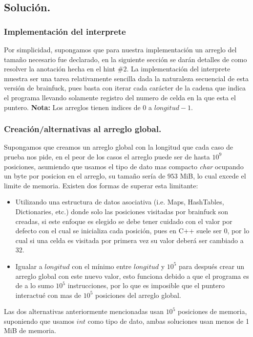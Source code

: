 \documentclass[12pt,letterpaper,titlepage]{article}
\begin{document}
	\subsection{Solución.}
	\subsubsection{Implementación del interprete}
	Por simplicidad, supongamos que para nuestra implementación un arreglo del tamaño necesario fue declarado, en la siguiente sección se darán detalles de como resolver la anotación hecha en el hint $\#2$. La implementación del interprete muestra ser una tarea relativamente sencilla dada la naturaleza secuencial de esta versión de brainfuck, pues basta con iterar cada carácter de la cadena que indica el programa llevando solamente registro del numero de celda en la que esta el puntero. \textbf{Nota:} Los arreglos tienen indices de 0 a $longitud-1$.
	
	\subsubsection{Creación/alternativas al arreglo global.}
	Supongamos que creamos un arreglo global con la longitud que cada caso de prueba nos pide, en el peor de los casos el arreglo puede ser de hasta $10^{9}$ posiciones, asumiendo que usamos el tipo de dato mas compacto \textit{char} ocupando un byte por posicion en el arreglo, su tamaño sería de $953$ MiB, lo cual excede el limite de memoria. Existen dos formas de superar esta limitante:
	\begin{itemize}
		\item Utilizando una estructura de datos asociativa (i.e. Maps, HashTables, Dictionaries, etc.) donde solo las posiciones visitadas por brainfuck son creadas, si este enfoque es elegido se debe tener cuidado con el valor por defecto con el cual se inicializa cada posición, pues en C++ suele ser 0, por lo cual si una celda es visitada por primera vez su valor deberá ser cambiado a 32.
		\item Igualar a $longitud$ con el mínimo entre $longitud$ y $10^{5}$ para después crear un arreglo global con este nuevo valor, esto funciona debido a que el programa es de a lo sumo $10^{5}$ instrucciones, por lo que es imposible que el puntero interactué con mas de $10^{5}$ posiciones del arreglo global.
	\end{itemize}
	Las dos alternativas anteriormente mencionadas usan $10^{5}$ posiciones de memoria, suponiendo que usamos $int$ como tipo de dato, ambas soluciones usan menos de 1 MiB de memoria.
\end{document}
